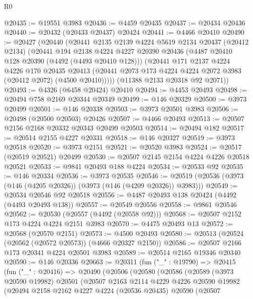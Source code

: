 \begin{lexlean}{R0}
\begin{coremodule}
@20435 := @19551 @3983
@20436 := @4459 @20435
@20437 := @20434 @20436
@20440 := @20432 (@20433 @20437) @20424
@20441 := @4466 @20410
@20490 := @20427
    (@20440
      (@20441
        @2135
        @2139
        @4224
        @5619
        @2134
        @20437
        (@20412 @2134)
        (@20441
          @194
          @2138
          @4224
          @4227
          @20390
          @20436
          (@4487 @20410 @128 @20390 (@4492 (@4493 @20410 @128)))
          (@20441
            @171
            @2137
            @4224
            @4226
            @170
            @20435
            @20413
            (@20441 @2073 @173 @4224 @4224 @2072 @3983 (@20412 @2072) (@4500 @20410)))))
      (@11388 @2133 @20318 @92 @2071))
@20493 := @4326 (@6458 @20424) @20410
@20494 := @4453 @20493
@20498 := @20494 @758 @2169 @20344 @20349
@20499 := @146 @20329
@20500 := @3973 @20499
@20501 := @146 @20338
@20503 := @3973 @20501 @3983
@20506 := @20498 (@20500 @20503) @20426
@20507 := @4466 @20493
@20513 := @20507 @2156 @2168 @20332 @20343 @20499 @20503
@20514 := @20494 @182
@20517 := @20514 @2155 @4227 @20331
@20518 := @146 @20327
@20519 := @3973 @20518
@20520 := @3973 @2151
@20521 := @20520 @3983
@20524 := @20517 (@20519 @20521) @20499
@20530 := @20507 @2145 @2154 @4224 @4226 @20518 @20521
@20533 := @9841 @20493 @188 @4224
@20534 := @20533 @92
@20535 := @146 @20334
@20536 := @3973 @20535
@20546 := @20519 (@20536 (@3973 (@146 (@4205 @20326)) (@3973 (@146 (@4209 @20326)) @3983)))
@20549 := @20534 @20546 @92 @20518
@20556 := @4487 @20493 @138 @20424 (@4492 (@4493 @20493 @138))
@20557 := @20549 @20556
@20558 := @9861 @20546
@20562 := @20530 (@20557 (@4492 (@20558 @92)))
@20568 := @20507 @2152 @173 @4224 @4224 @2151 @3983
@20570 := @4475 @20493 @13
@20572 := @20568 (@20570 @2151)
@20573 := @4500 @20493
@20580 := @20513 (@20524 (@20562 (@20572 @20573)) (@4666 @20327 @2150))
@20586 := @20507 @2166 @173 @20341 @4224 @20501 @3983
@20589 := @20514 @2165 @19346 @20340
@20590 := @146 @20336
@20663 := @20311
    (fun ("_" : @19790) =>
    @20415
      (fun ("_" : @20416) =>
      @20490
        (@20506
          (@20580
            (@20586
              (@20589
                (@3973 @20590 @19982)
                @20501
                (@20507
                  @2163
                  @2114
                  @4229
                  @4226
                  @20590
                  @19982
                  (@20494
                    @2158
                    @2162
                    @4227
                    @4224
                    (@20536 @20435)
                    @20590
                    (@20507

\end{coremodule}
\end{lexlean}
